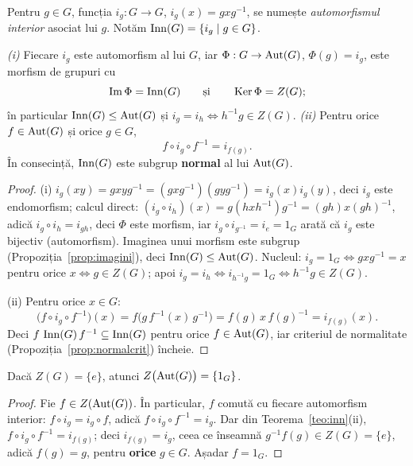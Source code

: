 \begin{definitie}
Pentru $g\in G$, funcția $i_g:G\to G$, $i_g(x)=gxg^{-1}$, se numește \emph{automorfismul interior} asociat lui $g$. Notăm $\operatorname{Inn}(G)=\{i_g\mid g\in G\}$.
\end{definitie}

\begin{teorema}\label{teo:inn}
\emph{(i)} Fiecare $i_g$ este automorfism al lui $G$, iar $\Phi:G\to\operatorname{Aut}(G)$, $\Phi(g)=i_g$, este morfism de grupuri cu
\[
\operatorname{Im}\Phi=\operatorname{Inn}(G)\qquad\text{și}\qquad\operatorname{Ker}\Phi=Z(G);
\]
în particular $\operatorname{Inn}(G)\le\operatorname{Aut}(G)$ și $i_g=i_h\iff h^{-1}g\in Z(G)$.
\emph{(ii)} Pentru orice $f\in\operatorname{Aut}(G)$ și orice $g\in G$,
\[
f\circ i_g\circ f^{-1}=i_{f(g)}.
\]
În consecință, $\operatorname{Inn}(G)$ este subgrup \textbf{normal} al lui $\operatorname{Aut}(G)$.
\end{teorema}

\begin{proof}
(i) $i_g(xy)=gxyg^{-1}=(gxg^{-1})(gyg^{-1})=i_g(x)i_g(y)$, deci $i_g$ este endomorfism; calcul direct: $(i_g\circ i_h)(x)=g(hxh^{-1})g^{-1}=(gh)x(gh)^{-1}$, adică $i_g\circ i_h=i_{gh}$, deci $\Phi$ este morfism, iar $i_g\circ i_{g^{-1}}=i_e=1_G$ arată că $i_g$ este bijectiv (automorfism). Imaginea unui morfism este subgrup (Propoziția~\ref{prop:imagini}), deci $\operatorname{Inn}(G)\le\operatorname{Aut}(G)$. Nucleul: $i_g=1_G\iff gxg^{-1}=x$ pentru orice $x\iff g\in Z(G)$; apoi $i_g=i_h\iff i_{h^{-1}g}=1_G\iff h^{-1}g\in Z(G)$.

(ii) Pentru orice $x\in G$:
\[
\bigl(f\circ i_g\circ f^{-1}\bigr)(x)=f\bigl(g\,f^{-1}(x)\,g^{-1}\bigr)=f(g)\,x\,f(g)^{-1}=i_{f(g)}(x).
\]
Deci $f\,\operatorname{Inn}(G)\,f^{-1}\subseteq\operatorname{Inn}(G)$ pentru orice $f\in\operatorname{Aut}(G)$, iar criteriul de normalitate (Propoziția~\ref{prop:normalcrit}) încheie.
\end{proof}

\begin{lema}\label{lema:centrutrivial}
Dacă $Z(G)=\{e\}$, atunci $Z\bigl(\operatorname{Aut}(G)\bigr)=\{1_G\}$.
\end{lema}

\begin{proof}
Fie $f\in Z(\operatorname{Aut}(G))$. În particular, $f$ comută cu fiecare automorfism interior: $f\circ i_g=i_g\circ f$, adică $f\circ i_g\circ f^{-1}=i_g$. Dar din Teorema~\ref{teo:inn}(ii), $f\circ i_g\circ f^{-1}=i_{f(g)}$; deci $i_{f(g)}=i_g$, ceea ce înseamnă $g^{-1}f(g)\in Z(G)=\{e\}$, adică $f(g)=g$, pentru \textbf{orice} $g\in G$. Așadar $f=1_G$.
\end{proof}

